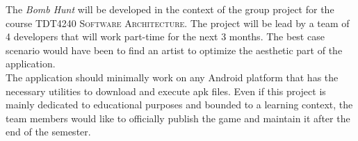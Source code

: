 The \textit{Bomb Hunt} will be developed in the context of the group project for the course \textsc{TDT4240 Software Architecture}. The project will be lead by a team of 4 developers that will work part-time for the next 3 months. The best case scenario would have been to find an artist to optimize the aesthetic part of the application. \\

The application should minimally work on any Android platform that has the necessary utilities to download and execute \gls{apk} files. Even if this project is mainly dedicated to educational purposes and bounded to a learning context, the team members would like to officially publish the game and maintain it after the end of the semester.
